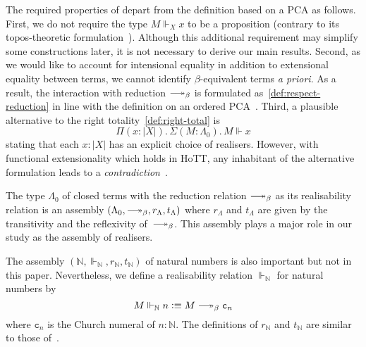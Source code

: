 \documentclass[a4paper,UKenglish,numberwithinsect,cleveref,thm-restate]{lipics-v2021}
\numberwithin{equation}{section}
\newcommand{\Nat}{\mathbb{N}}
\newcommand{\defeq}{\vcentcolon\equiv}
\DeclareRobustCommand\longtwoheadrightarrow{\relbar\joinrel\twoheadrightarrow}
\newcommand{\reduce}{\longtwoheadrightarrow_{\beta}}
\theoremstyle{plain}
\begin{document}
The required properties of  depart from the definition based on a PCA as follows. 
First, we do not require the type $M \Vdash_X x$ to be a proposition (contrary to its topos-theoretic formulation~\cite{Birkedal2002a}).
Although this additional requirement may simplify some constructions later, it is not necessary to derive our main results.
Second, as we would like to account for intensional equality in addition to extensional equality between terms,
we cannot identify $\beta$-equivalent terms \emph{a priori}.
As a result, the interaction with reduction $\reduce$ is formulated as~\eqref{def:respect-reduction} in line with the definition on an ordered PCA~\cite[Section~2.3]{Hofstra2003}.
Third, a plausible alternative to the right totality~\eqref{def:right-total} is
\[
  \Pi (x : |X|).\, \Sigma (M : \Lambda_0).\, M \Vdash x
\]
stating that each $x : |X|$ has an explicit choice of realisers.
However, with functional extensionality which holds in HoTT, any inhabitant of the alternative formulation leads to a \emph{contradiction}~\cite{Troelstra1977}. 

\begin{example}\label{ex:assembly-lambda}
  The type $\Lambda_0$ of closed terms with the reduction relation ${\reduce}$ as its realisability relation is an assembly $(\Lambda_0, \reduce, r_\Lambda, t_\Lambda)$ where $r_\Lambda$ and $t_\Lambda$ are given by the transitivity and the reflexivity of~$\reduce$.
  This assembly plays a major role in our study as the assembly of realisers.
\end{example}

\begin{example}
  The assembly $(\Nat, \Vdash_\Nat, r_{\Nat}, t_{\Nat})$ of natural numbers is also important but not in this paper.
  Nevertheless, we define a realisability relation $\Vdash_{\Nat}$ for natural numbers by
  \[
    M \Vdash_\Nat n \defeq M \reduce \mathtt{c}_n
  \]
  where $\mathtt{c}_n$ is the Church numeral of $n : \Nat$. The definitions of $r_\Nat$ and $t_\Nat$ are similar to those of~.  
\end{example}
\end{document}
